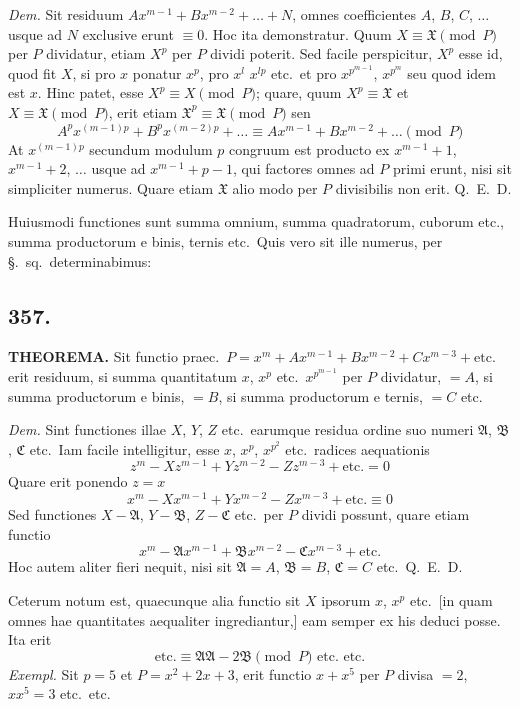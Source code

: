 \documentclass[12pt]{article}
\newcommand{\Sec}{\S}
\begin{document}
\textit{Dem.} Sit residuum $Ax^{m-1}+Bx^{m-2}+\ldots+N$, omnes coefficientes $A$, $B$, $C$, $\ldots$ usque ad $N$ exclusive erunt $\equiv 0$. Hoc ita demonstratur. Quum $X\equiv \mathfrak{X}\pmod{P}$ per $P$ dividatur, etiam $X^p$ per $P$ dividi poterit. Sed facile perspicitur, $X^p$ esse id, quod fit $X$, si pro $x$ ponatur $x^p$, pro $x^l$ $x^{lp}$ etc.~et pro $x^{p^{m-1}}$, $x^{p^m}$ seu quod idem est $x$. Hinc patet, esse $X^p\equiv X\pmod{P}$; quare, quum $X^p\equiv \mathfrak{X}$ et $X\equiv \mathfrak{X}\pmod{P}$, erit etiam $\mathfrak{X}^p\equiv \mathfrak{X}\pmod{P}$ sen
\[
A^p x^{(m-1)p} + B^p x^{(m-2)p} + \ldots \equiv Ax^{m-1} + Bx^{m-2} + \ldots \pmod{P}
\]
At $x^{(m-1)p}$ secundum modulum $p$ congruum est producto ex $x^{m-1}+1$, $x^{m-1}+2$, $\ldots$ usque ad $x^{m-1}+p-1$, qui factores omnes ad $P$ primi erunt, nisi sit simpliciter numerus. Quare etiam $\mathfrak{X}$ alio modo per $P$ divisibilis non erit. Q.~E.~D.

Huiusmodi functiones sunt summa omnium, summa quadratorum, cuborum etc., summa productorum e binis, ternis etc.~Quis vero sit ille numerus, per \Sec.~sq.~determinabimus:

\subsection*{357.}

\textbf{THEOREMA.} Sit functio praec.~$P=x^m+Ax^{m-1}+Bx^{m-2}+Cx^{m-3}+\text{etc.}$ erit residuum, si summa quantitatum $x$, $x^p$ etc.~$x^{p^{m-1}}$ per $P$ dividatur, $=A$, si summa productorum e binis, $=B$, si summa productorum e ternis, $=C$ etc.

\textit{Dem.} Sint functiones illae $X$, $Y$, $Z$ etc.~earumque residua ordine suo numeri $\mathfrak{A}$, $\mathfrak{B}$, $\mathfrak{C}$ etc.~Iam facile intelligitur, esse $x$, $x^p$, $x^{p^2}$ etc.~radices aequationis
\[
z^m - Xz^{m-1} + Yz^{m-2} - Zz^{m-3} + \text{etc.} = 0
\]
Quare erit ponendo $z=x$
\[
x^m - Xx^{m-1} + Yx^{m-2} - Zx^{m-3} + \text{etc.} \equiv 0
\]
Sed functiones $X-\mathfrak{A}$, $Y-\mathfrak{B}$, $Z-\mathfrak{C}$ etc.~per $P$ dividi possunt, quare etiam functio
\[
x^m - \mathfrak{A}x^{m-1} + \mathfrak{B}x^{m-2} - \mathfrak{C}x^{m-3} + \text{etc.}
\]
Hoc autem aliter fieri nequit, nisi sit $\mathfrak{A}=A$, $\mathfrak{B}=B$, $\mathfrak{C}=C$ etc.~Q.~E.~D.

Ceterum notum est, quaecunque alia functio sit $X$ ipsorum $x$, $x^p$ etc.~[in quam omnes hae quantitates aequaliter ingrediantur,] eam semper ex his deduci posse. Ita erit
\[
\text{etc.}\equiv \mathfrak{A}\mathfrak{A}-2\mathfrak{B} \pmod{P} \text{ etc.~etc.}
\]
\textit{Exempl.} Sit $p=5$ et $P=x^2+2x+3$, erit functio $x+x^5$ per $P$ divisa $=2$, $xx^5=3$ etc.~etc.
\end{document}
